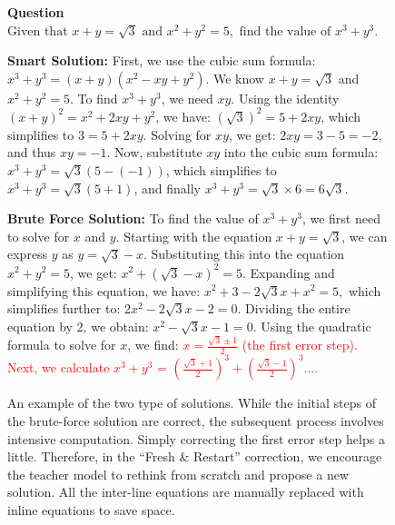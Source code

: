 
\begin{figure}
    \centering
    \small
    \begin{tcolorbox}
        \textbf{Question}
        $\text{Given that } x + y = \sqrt{3} \text{ and } x^2 + y^2 = 5, \text{ find the value of } x^3 + y^3.$

        \textbf{Smart Solution:} 
        First, we use the cubic sum formula: \(x^3 + y^3 = (x + y)(x^2 - xy + y^2)\).  
We know \( x + y = \sqrt{3} \) and \( x^2 + y^2 = 5 \). To find \( x^3 + y^3 \), we need \( xy \). Using the identity \( (x + y)^2 = x^2 + 2xy + y^2 \), we have:  
\( (\sqrt{3})^2 = 5 + 2xy \), which simplifies to  
\( 3 = 5 + 2xy \).  
Solving for \( xy \), we get:  
\( 2xy = 3 - 5 = -2 \), and thus  
\( xy = -1 \).  
Now, substitute \( xy \) into the cubic sum formula:  
\( x^3 + y^3 = \sqrt{3} \left( 5 - (-1) \right) \), which simplifies to  
\( x^3 + y^3 = \sqrt{3} \left( 5 + 1 \right) \), and finally  
\( x^3 + y^3 = \sqrt{3} \times 6 = 6\sqrt{3} \).

\textbf{Brute Force Solution:}
To find the value of \(x^3 + y^3\), we first need to solve for \(x\) and \(y\). Starting with the equation \(x + y = \sqrt{3}\), we can express \(y\) as \(y = \sqrt{3} - x\). Substituting this into the equation \(x^2 + y^2 = 5\), we get: \(x^2 + (\sqrt{3} - x)^2 = 5.\) Expanding and simplifying this equation, we have: \( x^2 + 3 - 2\sqrt{3}x + x^2 = 5, \) which simplifies further to: \( 2x^2 - 2\sqrt{3}x - 2 = 0. \)
Dividing the entire equation by 2, we obtain: \( x^2 - \sqrt{3}x - 1 = 0. \)
Using the quadratic formula to solve for \(x\), we find: \textcolor{red}{\( x = \frac{\sqrt{3} \pm 1}{2} \) (the first error step).
Next, we calculate \(x^3 + y^3\) = \(\left( \frac{\sqrt{3} + 1}{2} \right)^3 + \left( \frac{\sqrt{3} - 1}{2} \right)^3. ... \)
}

    \end{tcolorbox}
    \caption{An example of the two type of solutions. While the initial steps of the brute-force solution are correct, the subsequent process involves intensive computation. Simply correcting the first error step helps a little. Therefore, in the ``Fresh \& Restart'' correction, we encourage the teacher model to rethink from scratch and propose a new solution. All the inter-line equations are manually replaced with inline equations to save space.}
    \label{fig:two_solution}
\end{figure}